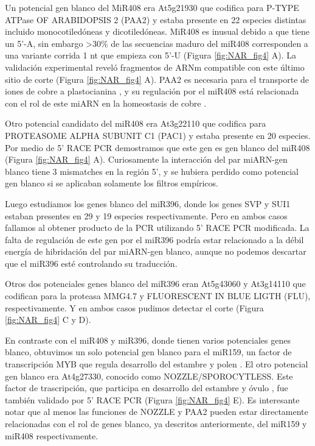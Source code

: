 Un potencial gen blanco del MiR408 era At5g21930 que codifica para P-TYPE ATPase OF ARABIDOPSIS 2 (PAA2) y estaba presente en 22 especies distintas incluido monocotiledóneas y dicotiledóneas.
MiR408 es inusual debido a que tiene un 5'-A, sin embargo >30\% de las secuencias maduro del miR408 corresponden a una variante corrida 1 nt que empieza con 5'-U \citep{Maunoury2011} (Figura \ref{fig:NAR_fig4} A).
La validación experimental reveló fragmentos de ARNm compatible con este último sitio de corte (Figura \ref{fig:NAR_fig4} A). 
PAA2 es necesaria para el transporte de iones de cobre a plastocianina \citep{Niyogi2005}, y su regulación por el miR408 está relacionada con el rol de este miARN en la homeostasis de cobre \citep{Yamasaki2007}.

Otro potencial candidato del miR408 era At3g22110 que codifica para PROTEASOME ALPHA SUBUNIT C1 (PAC1) y estaba presente en 20 especies. Por medio de 5' RACE PCR demostramos que este gen es gen blanco del miR408 (Figura \ref{fig:NAR_fig4} A). 
Curiosamente la interacción del par miARN-gen blanco tiene 3 mismatches en la región 5', y se hubiera perdido como potencial gen blanco si se aplicaban solamente los filtros empíricos.

Luego estudiamos los genes blanco del miR396, donde los genes SVP y SUI1 estaban presentes en 29 y 19 especies respectivamente.
Pero en ambos casos fallamos al obtener producto de la PCR utilizando 5' RACE PCR modificada.
La falta de regulación de este gen por el miR396 podría estar relacionado a la débil energía de hibridación del par miARN-gen blanco, aunque no podemos descartar que el miR396 esté controlando su traducción.

Otros dos potenciales genes blanco del miR396 eran At5g43060 y At3g14110 que codifican para la proteasa MMG4.7 y FLUORESCENT IN BLUE LIGTH (FLU), respectivamente.
Y en ambos casos pudimos detectar el corte (Figura \ref{fig:NAR_fig4} C y D).


En contraste con el miR408 y miR396, donde tienen varios potenciales genes blanco, obtuvimos un solo potencial gen blanco para el miR159, un factor de transcripción MYB que regula desarrollo del estambre y polen \citep{Millar2005}.
El otro potencial gen blanco era At4g27330, conocido como NOZZLE/SPOROCYTLESS.
Este factor de trascripción, que participa en desarrollo del estambre y óvulo \citep{Biology1999,Yang1999}, fue también validado por 5' RACE PCR (Figura \ref{fig:NAR_fig4} E).
Es interesante notar que al menos las funciones de NOZZLE y PAA2 pueden estar directamente relacionadas con el rol de genes blanco, ya descritos anteriormente, del miR159 y miR408 respectivamente.

